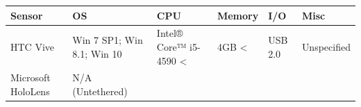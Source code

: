 \documentclass[12pt]{article}
\begin{document}
\begin{longtable}[]{@{}llllll@{}}
\toprule
\begin{minipage}[b]{0.14\columnwidth}\raggedright\strut
Sensor\strut
\end{minipage} & \begin{minipage}[b]{0.18\columnwidth}\raggedright\strut
OS\strut
\end{minipage} & \begin{minipage}[b]{0.20\columnwidth}\raggedright\strut
CPU\strut
\end{minipage} & \begin{minipage}[b]{0.10\columnwidth}\raggedright\strut
Memory\strut
\end{minipage} & \begin{minipage}[b]{0.10\columnwidth}\raggedright\strut
I/O\strut
\end{minipage} & \begin{minipage}[b]{0.11\columnwidth}\raggedright\strut
Misc\strut
\end{minipage}\tabularnewline
\midrule
\endhead
\begin{minipage}[t]{0.14\columnwidth}\raggedright\strut
HTC Vive\strut
\end{minipage} & \begin{minipage}[t]{0.18\columnwidth}\raggedright\strut
Win 7 SP1; Win 8.1; Win 10\strut
\end{minipage} & \begin{minipage}[t]{0.20\columnwidth}\raggedright\strut
Intel® Core™ i5-4590 \textless{}\strut
\end{minipage} & \begin{minipage}[t]{0.10\columnwidth}\raggedright\strut
4GB \textless{}\strut
\end{minipage} & \begin{minipage}[t]{0.10\columnwidth}\raggedright\strut
USB 2.0\strut
\end{minipage} & \begin{minipage}[t]{0.11\columnwidth}\raggedright\strut
Unspecified\strut
\end{minipage}\tabularnewline
\begin{minipage}[t]{0.14\columnwidth}\raggedright\strut
Microsoft HoloLens\strut
\end{minipage} & \begin{minipage}[t]{0.18\columnwidth}\raggedright\strut
N/A (Untethered)\strut
\end{minipage} & \begin{minipage}[t]{0.20\columnwidth}\raggedright\strut

\end{minipage}
\end{longtable}
\end{document}
